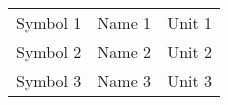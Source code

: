
\begin{table}[H]
\label{nomenclature}
\begin{tabular}{lll}
Symbol 1 & Name 1 & Unit 1 \\
Symbol 2 & Name 2 & Unit 2 \\
Symbol 3 & Name 3 & Unit 3 \\
\end{tabular}
\end{table}
